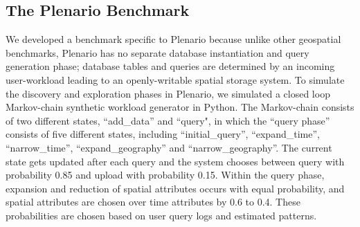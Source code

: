 \documentclass[11pt]{article}
\begin{document}
\subsection{The Plenario Benchmark}
We developed a benchmark specific to Plenario because unlike other geospatial benchmarks, Plenario has no separate database instantiation and query generation phase; database tables and queries are determined by an incoming user-workload leading to an openly-writable spatial storage system. To simulate the discovery and exploration phases in Plenario, we simulated a closed loop Markov-chain synthetic workload generator in Python. The  Markov-chain consists of two different states, ``add\_data'' and ``query", in which the ``query phase'' consists of five different states, including ``initial\_query'', ``expand\_time'', ``narrow\_time'', ``expand\_geography'' and ``narrow\_geography''.
The current state gets updated after each query and the system chooses between query with probability 0.85 and upload with probability 0.15. Within the query phase, expansion and reduction of spatial attributes occurs with equal probability, and spatial attributes are chosen over time attributes by 0.6 to 0.4. These probabilities are chosen based on user query logs and estimated patterns. 
\end{document}
